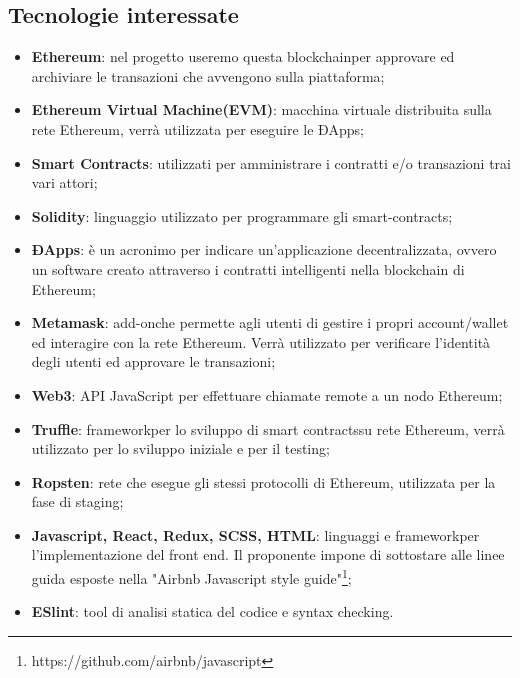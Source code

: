 \subsection{Tecnologie interessate}
\begin{itemize}
  
	\item \textbf{Ethereum\glo}: nel progetto useremo questa blockchain\glosp per approvare ed archiviare le transazioni che avvengono sulla piattaforma;
	\item \textbf{Ethereum Virtual Machine\glosp (EVM)}: macchina virtuale distribuita sulla rete Ethereum\glo, verrà utilizzata per eseguire le ÐApps\glo; 
	\item \textbf{Smart Contracts\glo}: utilizzati per amministrare i contratti e/o transazioni trai vari attori;
	\item \textbf{Solidity}: linguaggio utilizzato per programmare gli smart-contracts\glo;
	\item \textbf{ÐApps\glo}: è un acronimo per indicare un'applicazione decentralizzata, ovvero un software creato attraverso i contratti intelligenti nella blockchain di Ethereum\glo;
	\item \textbf{Metamask\glo}: add-on\glosp che permette agli utenti di gestire i propri account/wallet ed interagire con la rete Ethereum\glo. Verrà utilizzato per verificare l'identità degli utenti ed approvare le transazioni; 
	\item \textbf{Web3}: API JavaScript per effettuare chiamate remote a un nodo Ethereum\glo;
	\item \textbf{Truffle}: framework\glosp per lo sviluppo di smart contracts\glosp su rete Ethereum\glo, verrà utilizzato per lo sviluppo iniziale e per il testing;
	\item \textbf {Ropsten}: rete che esegue gli stessi protocolli di Ethereum\glo, utilizzata per la fase di staging\glo;
	\item \textbf{Javascript, React\glo, Redux\glo, SCSS\glo, HTML}: linguaggi e framework\glosp per l'implementazione del front end. Il proponente impone di sottostare alle linee guida esposte nella "Airbnb Javascript style guide"\footnote{https://github.com/airbnb/javascript};
	\item \textbf{ESlint\glo}: tool di analisi statica del codice e syntax checking.

\end{itemize}

